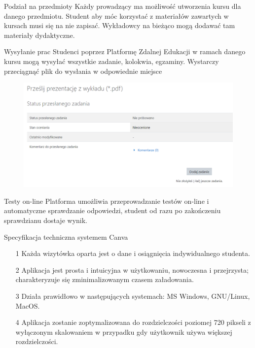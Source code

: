 \documentclass{beamer}
\begin{document}
\begin{frame}{Podział na przedmioty}
    Każdy prowadzący ma możliwość utworzenia kursu dla danego przedmiotu. Student aby móc korzystać z materiałów zawartych w kursach musi się na nie zapisać. Wykładowcy na bieżąco mogą dodawać tam materiały dydaktyczne.
\end{frame}
\begin{frame}{Wysyłanie prac}
    Studenci poprzez Platformę Zdalnej Edukacji w ramach danego kursu mogą wysyłać wszystkie zadanie, kolokwia, egzaminy. 
    Wystarczy przeciągnąć plik do wysłania w odpowiednie miejsce
    \begin{figure}[H!]
        \centering
        \includegraphics[width=\textwidth]{przesylanie.PNG}
    
        
    \end{figure}
\end{frame}

\begin{frame}{Testy on-line}
    Platforma umożliwia przeprowadzanie testów on-line i automatyczne sprawdzanie odpowiedzi, student od razu po zakończeniu sprawdzianu dostaje wynik.
\end{frame}

\begin{frame}{Specyfikacja techniczna systemem Canva}
    \begin{enumerate}
        \item[1] Każda wizytówka oparta jest o dane i osiągnięcia indywidualnego studenta.
        \item[2] Aplikacja jest prosta i intuicyjna w użytkowaniu, nowoczesna i przejrzysta; charakteryzuje
    się zminimalizowanym czasem załadowania.
        \item[3] Działa prawidłowo w następujących systemach: MS Windows, GNU/Linux, MacOS.
        \item[4] Aplikacja zostanie zoptymalizowana do rozdzielczości poziomej 720 pikseli
    z wyłączonym skalowaniem w przypadku gdy użytkownik używa większej rozdzielczości.
    \end{enumerate}
\end{frame}
\end{document}
